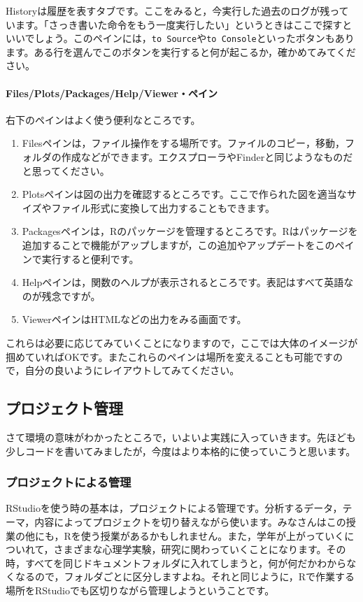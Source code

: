\documentclass{ltjsbook}
\begin{document}
Historyは履歴を表すタブです。ここをみると，今実行した過去のログが残っています。「さっき書いた命令をもう一度実行したい」というときはここで探すといいでしょう。このペインには，\texttt{to Source}や\texttt{to Console}といったボタンもあります。ある行を選んでこのボタンを実行すると何が起こるか，確かめてみてください。
\paragraph{Files/Plots/Packages/Help/Viewer・ペイン}
右下のペインはよく使う便利なところです。
\begin{enumerate}
	\item Filesペインは，ファイル操作をする場所です。ファイルのコピー，移動，フォルダの作成などができます。エクスプローラやFinderと同じようなものだと思ってください。
	\item Plotsペインは図の出力を確認するところです。ここで作られた図を適当なサイズやファイル形式に変換して出力することもできます。
	\item Packagesペインは，Rのパッケージを管理するところです。Rはパッケージを追加することで機能がアップしますが，この追加やアップデートをこのペインで実行すると便利です。
	\item Helpペインは，関数のヘルプが表示されるところです。表記はすべて英語なのが残念ですが。
	\item ViewerペインはHTMLなどの出力をみる画面です。
\end{enumerate}
これらは必要に応じてみていくことになりますので，ここでは大体のイメージが掴めていればOKです。またこれらのペインは場所を変えることも可能ですので，自分の良いようにレイアウトしてみてください。

\subsection{プロジェクト管理}
さて環境の意味がわかったところで，いよいよ実践に入っていきます。先ほども少しコードを書いてみましたが，今度はより本格的に使っていこうと思います。
\subsubsection{プロジェクトによる管理}
\label{UnderProject}

RStudioを使う時の基本は，プロジェクトによる管理です。分析するデータ，テーマ，内容によってプロジェクトを切り替えながら使います。みなさんはこの授業の他にも，Rを使う授業があるかもしれません。また，学年が上がっていくについれて，さまざまな心理学実験，研究に関わっていくことになります。その時，すべてを同じドキュメントフォルダに入れてしまうと，何が何だかわからなくなるので，フォルダごとに区分しますよね。それと同じように，Rで作業する場所をRStudioでも区切りながら管理しようということです。
\end{document}
